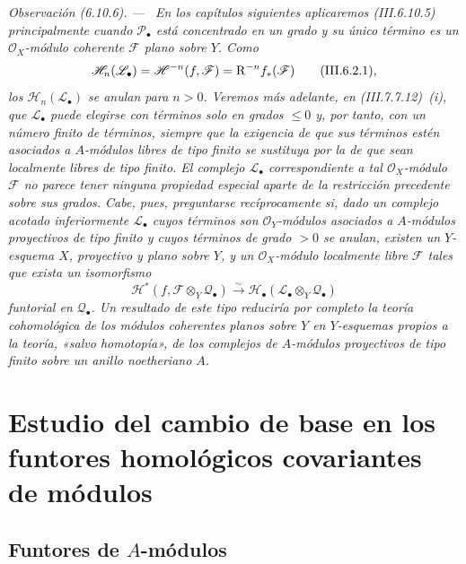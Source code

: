 \documentclass[10pt,oneside]{book}
\newcommand{\sh}[1]{\mathscr{#1}}
\newcommand{\sref}[2][]{\textup{(#2)}}
\newcommand{\oldpage}[2][]{\setcounter{footnote}{0}\marginpar{\scriptsize\textbf{#1}~|~#2}\ignorespaces}
\newenvironment{remark}[1][]{\par\medskip\noindent\itshape Observación (#1). ---\ }{\par}
\begin{document}
\begin{remark}[6.10.6]
\label{III.6.10.6}
En los capítulos siguientes aplicaremos \sref{III.6.10.5}
principalmente cuando $\sh P_\bullet$ está concentrado en un grado
y su único término es un $\sh O_X$-módulo coherente $\sh F$ plano
sobre $Y$. Como
\[
  \sh H_n(\sh L_\bullet)
  =
  \sh H^{-n}(f,\sh F)
  =
  \mathrm R^{-n}f_*(\sh F)
  \qquad\text{\sref{III.6.2.1}},
\]
los $\sh H_n(\sh L_\bullet)$ se anulan para $n>0$. Veremos más
adelante, en \sref{III.7.7.12}~(i), que $\sh L_\bullet$ puede
elegirse \emph{con términos solo en grados} $\leq0$ y, por tanto, con un
número \emph{finito} de términos, siempre que la exigencia de que sus
términos estén asociados a $A$-módulos libres de tipo finito se
sustituya por la de que sean \emph{localmente libres} de tipo finito.
El complejo $\sh L_\bullet$ correspondiente a tal
$\sh O_X$-módulo $\sh F$ no parece tener ninguna propiedad
especial
\oldpage[III]{175}
aparte de la restricción precedente sobre sus grados. Cabe, pues,
preguntarse recíprocamente si, dado un complejo acotado
inferiormente $\sh L_\bullet$ cuyos términos son
$\sh O_Y$-módulos asociados a $A$-módulos proyectivos de tipo
finito y cuyos términos de grado $>0$ se anulan, existen un
$Y$-esquema $X$, proyectivo y plano sobre $Y$, y un
$\sh O_X$-módulo localmente libre $\sh F$ tales que exista un
isomorfismo
\[
  \sh H^*
  (f,\sh F\otimes_Y\sh Q_\bullet)
  \xrightarrow{\sim}
  \sh H_\bullet
  (\sh L_\bullet\otimes_Y\sh Q_\bullet)
\]
funtorial en $\sh Q_\bullet$. Un resultado de este tipo reduciría
por completo la teoría cohomológica de los módulos coherentes
planos sobre $Y$ en $Y$-esquemas propios a la teoría, «salvo
homotopía», de los complejos de $A$-módulos proyectivos de tipo
finito sobre un anillo noetheriano $A$.
\end{remark}

\section{Estudio del cambio de base en los funtores homológicos covariantes de módulos}
\label{section:III.7}

\subsection{Funtores de $A$-módulos}
\label{subsection:III.7.1}
\end{document}
